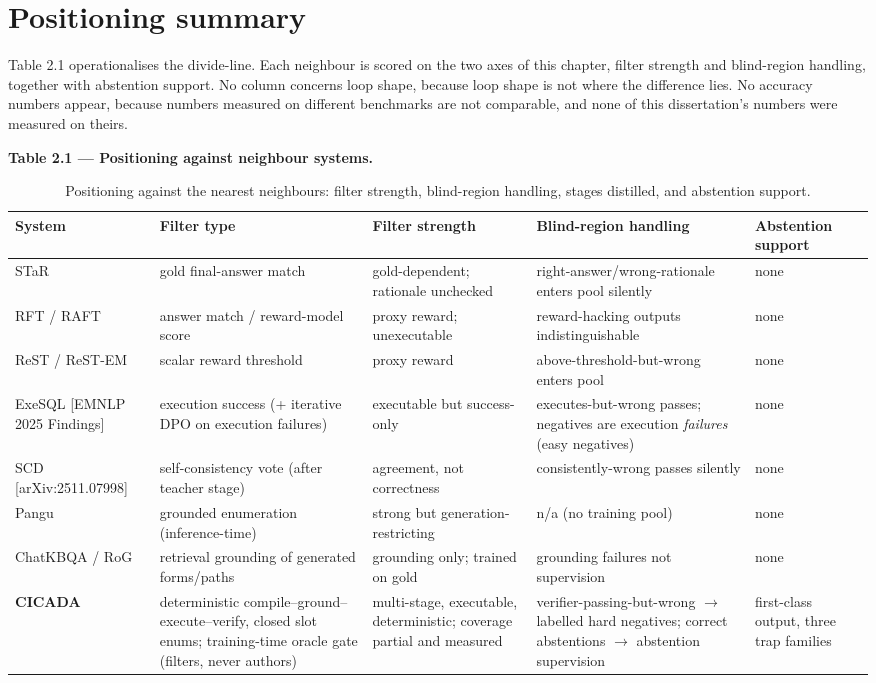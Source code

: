 \section{Positioning summary}\label{sec:positioning-summary}

Table 2.1 operationalises the divide-line. Each neighbour is scored on the two axes of this chapter, filter strength and blind-region handling, together with abstention support. No column concerns loop shape, because loop shape is not where the difference lies. No accuracy numbers appear, because numbers measured on different benchmarks are not comparable, and none of this dissertation's numbers were measured on theirs.

\textbf{Table 2.1 --- Positioning against neighbour systems.}

\begin{table}[t]
\centering
\small
\caption{Positioning against the nearest neighbours: filter strength, blind-region handling, stages distilled, and abstention support.}
\label{tab:02_background_1}
\begin{tabular}{lllll}
\toprule
System & Filter type & Filter strength & Blind-region handling & Abstention support \\
\midrule
STaR \citep{zelikman2022star} & gold final-answer match & gold-dependent; rationale unchecked & right-answer/wrong-rationale enters pool silently & none \\
RFT / RAFT \citep{yuan2023rft} & answer match / reward-model score & proxy reward; unexecutable & reward-hacking outputs indistinguishable & none \\
ReST / ReST-EM \citep{gulcehre2023rest,singh2024restem} & scalar reward threshold & proxy reward & above-threshold-but-wrong enters pool & none \\
ExeSQL [EMNLP 2025 Findings] & execution success (+ iterative DPO on execution failures) & executable but success-only & executes-but-wrong passes; negatives are execution \emph{failures} (easy negatives) & none \\
SCD [arXiv:2511.07998] & self-consistency vote (after teacher stage) & agreement, not correctness & consistently-wrong passes silently & none \\
Pangu \citep{gu2023pangu} & grounded enumeration (inference-time) & strong but generation-restricting & n/a (no training pool) & none \\
ChatKBQA \citep{luo2024chatkbqa} / RoG \citep{luo2024rog} & retrieval grounding of generated forms/paths & grounding only; trained on gold & grounding failures not supervision & none \\
\textbf{CICADA} & deterministic compile--ground--execute--verify, closed slot enums; training-time oracle gate (filters, never authors) & multi-stage, executable, deterministic; coverage partial and measured & verifier-passing-but-wrong $\rightarrow$ labelled hard negatives; correct abstentions $\rightarrow$ abstention supervision & first-class output, three trap families \\
\bottomrule
\end{tabular}
\end{table}


